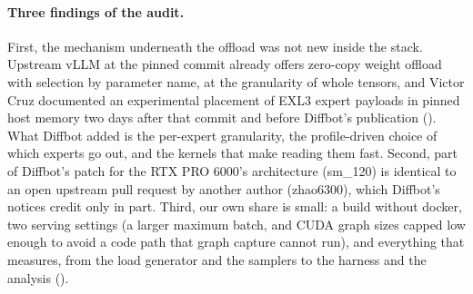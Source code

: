 \paragraph{Three findings of the audit.}
First, the mechanism underneath the offload was not new inside the stack. Upstream vLLM at the pinned commit already
offers zero-copy weight offload with selection by parameter name, at the granularity of whole tensors, and Victor Cruz
documented an experimental placement of EXL3 expert payloads in pinned host memory two days after that commit and
before Diffbot's publication (). What Diffbot added is the
per-expert granularity, the profile-driven choice of which experts go out, and the kernels that make reading them
fast. Second, part of Diffbot's patch for the RTX PRO 6000's architecture (sm\_120) is identical to an open upstream
pull request by another author (zhao6300), which Diffbot's notices credit only in part. Third, our own share is small:
a build without docker, two serving settings (a larger maximum batch, and CUDA graph sizes capped low enough to avoid
a code path that graph capture cannot run), and everything that measures, from the load generator and the samplers to
the harness and the analysis ().

